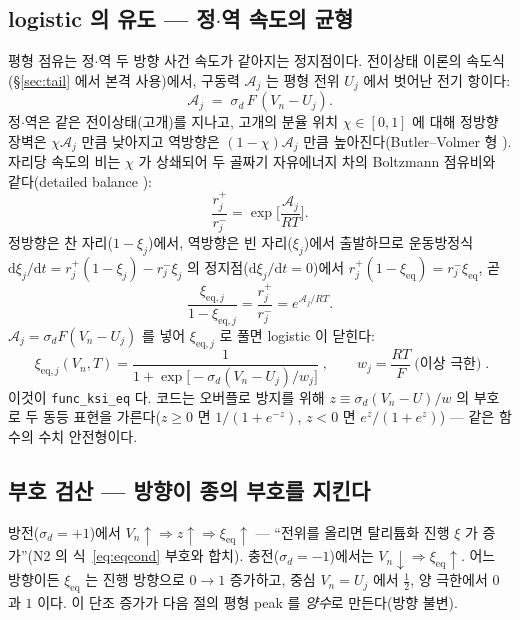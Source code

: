 \documentclass[11pt,a4paper]{article}
\newcommand{\dd}{\mathrm{d}}
\newcommand{\eq}{\mathrm{eq}}
\newcommand{\code}[1]{\texttt{#1}}
\begin{document}
\subsection{logistic 의 유도 — 정$\cdot$역 속도의 균형}
평형 점유는 정$\cdot$역 두 방향 사건 속도가 같아지는 정지점이다. 전이상태 이론의 속도식(§\ref{sec:tail} 에서 본격 사용)에서, 구동력 $\mathcal A_j$ 는 평형 전위 $U_j$ 에서 벗어난 전기 항이다:
\begin{equation}
\mathcal A_j\;=\;\sigma_d\,F\,(V_n-U_j).
\label{eq:affinity}
\end{equation}
정$\cdot$역은 같은 전이상태(고개)를 지나고, 고개의 분율 위치 $\chi\in[0,1]$ 에 대해 정방향 장벽은 $\chi\mathcal A_j$ 만큼 낮아지고 역방향은 $(1-\chi)\mathcal A_j$ 만큼 높아진다(Butler--Volmer 형 \cite{bardfaulkner,evanspolanyi1938}). 자리당 속도의 비는 $\chi$ 가 상쇄되어 두 골짜기 자유에너지 차의 Boltzmann 점유비와 같다(detailed balance \cite{bazant2013}):
\begin{equation}
\frac{r_j^+}{r_j^-}=\exp\!\Big[\frac{\mathcal A_j}{RT}\Big].
\label{eq:db}
\end{equation}
정방향은 찬 자리($1-\xi_j$)에서, 역방향은 빈 자리($\xi_j$)에서 출발하므로 운동방정식 $\dd\xi_j/\dd t=r_j^+(1-\xi_j)-r_j^-\xi_j$ 의 정지점($\dd\xi_j/\dd t=0$)에서 $r_j^+(1-\xi_\eq)=r_j^-\xi_\eq$, 곧
\begin{equation}
\frac{\xi_{\eq,j}}{1-\xi_{\eq,j}}=\frac{r_j^+}{r_j^-}=e^{\mathcal A_j/RT}.
\label{eq:stationary}
\end{equation}
$\mathcal A_j=\sigma_dF(V_n-U_j)$ 를 넣어 $\xi_{\eq,j}$ 로 풀면 logistic 이 닫힌다:
\begin{equation}
\boxed{\;\xi_{\eq,j}(V_n,T)=\frac{1}{1+\exp\!\big[-\sigma_d(V_n-U_j)/w_j\big]}\;,\qquad
w_j=\frac{RT}{F}\ \text{(이상 극한)}\;.}
\label{eq:logistic}
\end{equation}
이것이 \code{func\_ksi\_eq} 다. 코드는 오버플로 방지를 위해 $z\equiv\sigma_d(V_n-U)/w$ 의 부호로 두 동등 표현을 가른다($z\ge0$ 면 $1/(1+e^{-z})$, $z<0$ 면 $e^z/(1+e^z)$) — 같은 함수의 수치 안전형이다.

\subsection{부호 검산 — 방향이 종의 부호를 지킨다}
방전($\sigma_d=+1$)에서 $V_n\uparrow\Rightarrow z\uparrow\Rightarrow\xi_\eq\uparrow$ — ``전위를 올리면 탈리튬화 진행 $\xi$ 가 증가''(N2 의 식~\eqref{eq:eqcond} 부호와 합치). 충전($\sigma_d=-1$)에서는 $V_n\downarrow\Rightarrow\xi_\eq\uparrow$. 어느 방향이든 $\xi_\eq$ 는 진행 방향으로 $0\to1$ 증가하고, 중심 $V_n=U_j$ 에서 $\tfrac12$, 양 극한에서 $0$ 과 $1$ 이다. 이 단조 증가가 다음 절의 평형 peak 를 \emph{양수}로 만든다(방향 불변).
\end{document}
